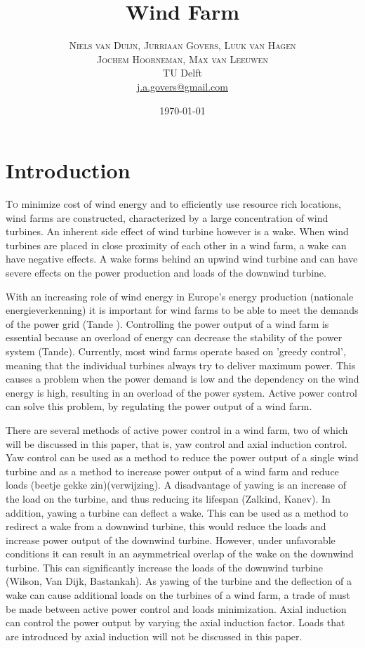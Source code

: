 \documentclass[twoside,twocolumn]{article}
\title{Wind Farm} %
\author{%
	\textsc{Niels van Duijn, Jurriaan Govers, Luuk van Hagen}\\
	\textsc{Jochem Hoorneman, Max van Leeuwen}\\%
	\normalsize TU Delft \\ %
	\normalsize \href{mailto:j.a.govers@gmail.com}{j.a.govers@gmail.com} %
}
\date{\today} %
\begin{document}
	
	\maketitle
	
	
	\section{Introduction}
	
	\lettrine[nindent=0em,lines=3]To minimize cost of wind energy and to efficiently use resource rich locations, wind farms are constructed, characterized by a large concentration of wind turbines. An inherent side effect of wind turbine however is a wake. When wind turbines are placed in close proximity of each other in a wind farm, a wake can have negative effects. A wake forms behind an upwind wind turbine and can have severe effects on the power production and loads of the downwind turbine.

With an increasing role of wind energy in Europe's energy production (nationale energieverkenning) it is important for wind farms to be able to meet the demands of the power grid (Tande ). Controlling the power output of a wind farm is essential because an overload of energy can decrease the stability of the power system (Tande). Currently, most wind farms operate based on 'greedy control', meaning that the individual turbines always try to deliver maximum power. This causes a problem when the power demand is low and the dependency on the wind energy is high, resulting in an overload of the power system. Active power control can solve this problem, by regulating the power output of a wind farm.

There are several methods of active power control in a wind farm, two of which will be discussed in this paper, that is, yaw control and axial induction control. Yaw control can be used as a method to reduce the power output of a single wind turbine and as a method to increase power output of a wind farm and reduce loads (beetje gekke zin)(verwijzing). A disadvantage of yawing is an increase of the load on the turbine, and thus reducing its lifespan (Zalkind, Kanev). In addition, yawing a turbine can deflect a wake. This can be used as a method to redirect a wake from a downwind turbine, this would reduce the loads and increase power output of the downwind turbine. However, under unfavorable conditions it can result in an asymmetrical overlap of the wake on the downwind turbine. This can significantly increase the loads of the downwind turbine (Wilson, Van Dijk, Bastankah). As yawing of the turbine and the deflection of a wake can cause additional loads on the turbines of a wind farm, a trade of must be made between active power control and loads minimization. Axial induction can control the power output by varying the axial induction factor. Loads that are introduced by axial induction will not be discussed in this paper. 
\end{document}
